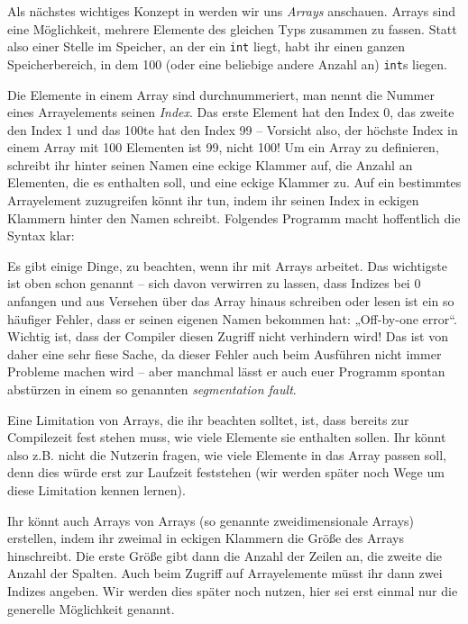 
Als nächstes wichtiges Konzept in \Cpp werden wir uns \emph{Arrays} anschauen.
Arrays sind eine Möglichkeit, mehrere Elemente des gleichen Typs zusammen zu
fassen. Statt also einer Stelle im Speicher, an der ein \texttt{int} liegt,
habt ihr einen ganzen Speicherbereich, in dem 100 (oder eine beliebige andere
Anzahl an) \texttt{int}s liegen.

Die Elemente in einem Array sind durchnummeriert, man nennt die Nummer eines
Arrayelements seinen \emph{Index}. Das erste Element hat den Index 0, das
zweite den Index 1 und das 100te hat den Index 99 -- Vorsicht also, der höchste
Index in einem Array mit 100 Elementen ist 99, nicht 100! Um ein Array zu
definieren, schreibt ihr hinter seinen Namen eine eckige Klammer auf, die
Anzahl an Elementen, die es enthalten soll, und eine eckige Klammer zu. Auf ein
bestimmtes Arrayelement zuzugreifen könnt ihr tun, indem ihr seinen Index in
eckigen Klammern hinter den Namen schreibt. Folgendes Programm macht
hoffentlich die Syntax klar:

Es gibt einige Dinge, zu beachten, wenn ihr mit Arrays arbeitet. Das
wichtigste ist oben schon genannt -- sich davon verwirren zu lassen, dass
Indizes bei 0 anfangen und aus Versehen über das Array hinaus schreiben oder
lesen ist ein so häufiger Fehler, dass er seinen eigenen Namen bekommen hat:
„Off-by-one error“. Wichtig ist, dass der Compiler diesen Zugriff nicht
verhindern wird! Das ist von daher eine sehr fiese Sache, da dieser
Fehler auch beim Ausführen nicht immer Probleme machen wird -- aber manchmal
lässt er auch euer Programm spontan abstürzen in einem so genannten
\emph{segmentation fault}.

Eine Limitation von Arrays, die ihr beachten solltet, ist, dass bereits zur
Compilezeit fest stehen muss, wie viele Elemente sie enthalten sollen. Ihr
könnt also z.B. nicht die Nutzerin fragen, wie viele Elemente in das Array
passen soll, denn dies würde erst zur Laufzeit feststehen (wir werden später
noch Wege um diese Limitation kennen lernen).

Ihr könnt auch Arrays von Arrays (so genannte zweidimensionale Arrays)
erstellen, indem ihr zweimal in eckigen Klammern die Größe des Arrays
hinschreibt. Die erste Größe gibt dann die Anzahl der Zeilen an, die zweite die
Anzahl der Spalten. Auch beim Zugriff auf Arrayelemente müsst ihr dann zwei
Indizes angeben. Wir werden dies später noch nutzen, hier sei erst einmal nur
die generelle Möglichkeit genannt.

